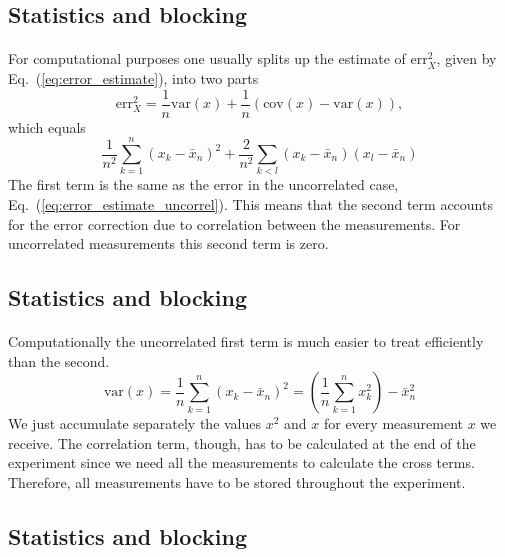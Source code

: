\documentclass[%
twoside,                 %
final,                   %
10pt]{article}
\begin{document}
\subsection*{Statistics and blocking}

\paragraph{}
For computational purposes one usually splits up the estimate of
$\mathrm{err}_X^2$, given by Eq.~(\ref{eq:error_estimate}), into two
parts
\[
\mathrm{err}_X^2 = \frac{1}{n}\mathrm{var}(x) + \frac{1}{n}(\mathrm{cov}(x)-\mathrm{var}(x)),
\]
which equals
\begin{equation}
\frac{1}{n^2}\sum_{k=1}^n (x_k - \bar x_n)^2 +\frac{2}{n^2}\sum_{k<l} (x_k - \bar x_n)(x_l - \bar x_n)
\label{eq:error_estimate_split_up}
\end{equation}
The first term is the same as the error in the uncorrelated case,
Eq.~(\ref{eq:error_estimate_uncorrel}). This means that the second
term accounts for the error correction due to correlation between the
measurements. For uncorrelated measurements this second term is zero.



\subsection*{Statistics and blocking}

\paragraph{}
Computationally the uncorrelated first term is much easier to treat
efficiently than the second.
\[
\mathrm{var}(x) = \frac{1}{n}\sum_{k=1}^n (x_k - \bar x_n)^2 =
\left(\frac{1}{n}\sum_{k=1}^n x_k^2\right) - \bar x_n^2
\]
We just accumulate separately the values $x^2$ and $x$ for every
measurement $x$ we receive. The correlation term, though, has to be
calculated at the end of the experiment since we need all the
measurements to calculate the cross terms. Therefore, all measurements
have to be stored throughout the experiment.






\subsection*{Statistics and blocking}
\end{document}
